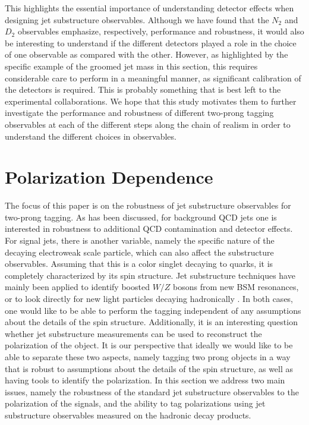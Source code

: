 \documentclass[11pt,letterpaper]{article}
\begin{document}
This highlights the essential importance of understanding detector effects when designing jet substructure observables. Although we have found that the $N_2$ and $D_2$ observables emphasize, respectively, performance and robustness, it would also be interesting to understand if the different detectors played a role in the choice of one observable as compared with the other. However, as highlighted by the specific example of the groomed jet mass in this section, this requires considerable care to perform in a meaningful manner, as significant calibration of the detectors is required. This is probably something that is best left to the experimental collaborations. We hope that this study motivates them to further investigate the performance and robustness of different two-prong tagging observables at each of the different steps along the chain of realism in order to understand the different choices in observables.







\section{Polarization Dependence}\label{sec:polar}




The focus of this paper is on the robustness of jet substructure
observables for two-prong tagging.
%
As has been discussed, for
background QCD jets one is interested in robustness to additional QCD
contamination and detector effects. For signal jets, there is another variable, namely the specific nature of the decaying electroweak scale particle, which can also affect the substructure observables.
%
Assuming
that this is a color singlet decaying to quarks, it is completely
characterized by its spin structure.
%
Jet substructure techniques have
mainly been applied to identify boosted $W/Z$ bosons from new BSM
resonances, or to look directly for new light particles decaying
hadronically \cite{CMS-PAS-EXO-17-001}.
%
In both cases, one would like
to be able to perform the tagging independent of any assumptions about
the details of the spin structure.
%
Additionally, it is an interesting
question whether jet substructure measurements can be used to
reconstruct the polarization of the object.
%
It is our perspective that
ideally we would like to be able to separate these two aspects, namely
tagging two prong objects in a way that is robust to assumptions about
the details of the spin structure, as well as having tools to identify
the polarization.
%
In this section we address two main issues, namely
the robustness of the standard jet substructure observables to the
polarization of the signals, and the ability to tag polarizations
using jet substructure observables measured on the hadronic decay
products.
\end{document}
